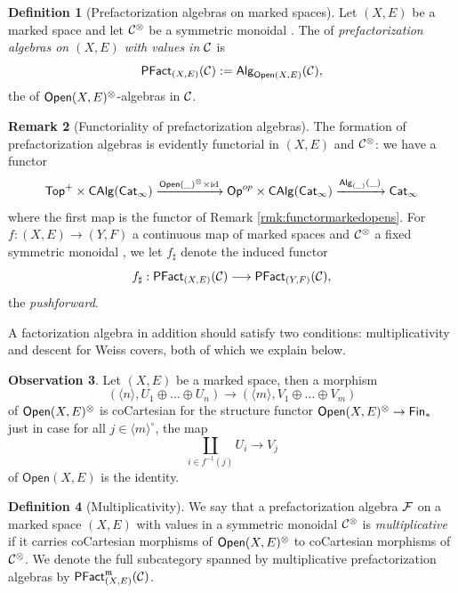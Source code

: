 \documentclass[10pt, reqno, twoside
, final
]{amsart}
\numberwithin{equation}{subsection}%
\theoremstyle{definition}
\newtheorem{defn}{Definition}[subsection]
\theoremstyle{definition}
\theoremstyle{definition}
\theoremstyle{definition}
\theoremstyle{definition}
\theoremstyle{definition}
\theoremstyle{definition}
\theoremstyle{definition}
\theoremstyle{definition}
\theoremstyle{plain}
\theoremstyle{definition}
\newtheorem{obs}[defn]{Observation}
\theoremstyle{plain}
\theoremstyle{definition}
\theoremstyle{plain}
\theoremstyle{definition}
\newtheorem{rmk}[defn]{Remark}
\theoremstyle{definition}
\theoremstyle{plain}
\theoremstyle{plain}
\theoremstyle{definition}
\theoremstyle{plain}
\theoremstyle{plain}
\theoremstyle{plain}
\begin{document}
\begin{defn}[Prefactorization algebras on marked spaces]
Let $(X,E)$ be a marked space and let $\mathcal{C}^{\otimes}$ be a symmetric monoidal \infcatt. The \infcat of \emph{prefactorization algebras on $(X,E)$ with values in $\mathcal{C}$} is
\[ \mathsf{PFact}_{(X,E)}(\mathcal{C}):= \mathsf{Alg}_{\mathsf{Open}(X,E)}(\mathcal{C}), \]
the \infcat of $\mathsf{Open}(X,E)^{\otimes}$-algebras in $\mathcal{C}$.
\end{defn}
\begin{rmk}[Functoriality of prefactorization algebras]\label{rmk:pushfwd}
The formation of prefactorization algebras is evidently functorial in $(X,E)$ and $\mathcal{C}^{\otimes}$: we have a functor
\[  \mathsf{Top}^+\times \mathsf{CAlg}(\mathsf{Cat}_{\infty}) \xrightarrow{\mathsf{Open}(\_)^{\otimes}\times \mathrm{id}} \mathsf{Op}^{op} \times \mathsf{CAlg}(\mathsf{Cat}_{\infty}) \xrightarrow{\mathsf{Alg}_{(\_)}(\_)}\mathsf{Cat}_{\infty}  \]
where the first map is the functor of Remark \ref{rmk:functormarkedopens}. For $f:(X,E)\rightarrow (Y,F)$ a continuous map of marked spaces and $\mathcal{C}^{\otimes}$ a fixed symmetric monoidal \infcatt, we let $f_{\sharp}$ denote the induced functor 
\[  f_{\sharp}:\mathsf{PFact}_{(X,E)}(\mathcal{C})\longrightarrow \mathsf{PFact}_{(Y,F)}(\mathcal{C}), \]
the \emph{pushforward}. 
\end{rmk}
A factorization algebra in addition should satisfy two conditions: multiplicativity and descent for Weiss covers, both of which we explain below.
\begin{obs}
Let $(X,E)$ be a marked space, then a morphism 
\[  \left(\langle n\rangle, U_1\oplus\ldots \oplus U_n \right) \longrightarrow  \left(\langle m\rangle, V_1\oplus\ldots \oplus V_m \right)\]
of $\mathsf{Open}(X,E)^{\otimes}$ is coCartesian for the structure functor $\mathsf{Open}(X,E)^{\otimes}\rightarrow \mathsf{Fin}_*$ just in case for all $j\in \langle m\rangle^{\circ}$, the map 
\[  \coprod_{i\in f^{-1}(j)} U_i\longrightarrow V_j \]
of $\mathsf{Open}(X,E)$ is the identity.
\end{obs}


\begin{defn}[Multiplicativity]
We say that a prefactorization algebra $\mathcal{F}$ on a marked space $(X,E)$ with values in a symmetric monoidal \infcat $\mathcal{C}^{\otimes}$ is \emph{multiplicative} if it carries coCartesian morphisms of $\mathsf{Open}(X,E)^{\otimes}$ to coCartesian morphisms of $\mathcal{C}^{\otimes}$. We denote the full subcategory spanned by multiplicative prefactorization algebras by $\mathsf{PFact}^{\mathfrak{m}}_{(X,E)}(\mathcal{C})$.	
\end{defn}
\end{document}
